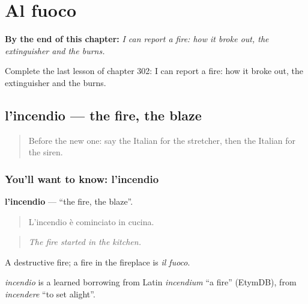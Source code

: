 
\chapter{Al fuoco}
\label{ch:it-al-fuoco}

\begin{chapteropening}
\textbf{By the end of this chapter:} \emph{I can report a fire: how it broke out, the extinguisher and the burns.}

Complete the last lesson of chapter 302: I can report a fire: how it broke out, the extinguisher and the burns.
\end{chapteropening}

\section[l'incendio]{l'incendio — the fire, the blaze}

\label{lesson:IT-C302-incendio}



\begin{quote}
Before the new one: say the Italian for the stretcher, then the Italian for the siren.
\end{quote}

\subsection*{You'll want to know: l'incendio}
\textbf{l'incendio} — \textquotedblleft{}the fire, the blaze\textquotedblright{}.

\begin{quote}
L'incendio è cominciato in cucina.
\end{quote}

\begin{quote}
\emph{The fire started in the kitchen.}
\end{quote}

A destructive fire; a fire in the fireplace is \emph{il fuoco}.

\begin{cousinweb}
\emph{incendio} is a learned borrowing from Latin \emph{incendium} \textquotedblleft{}a fire\textquotedblright{} (EtymDB), from \emph{incendere} \textquotedblleft{}to set alight\textquotedblright{}.
\end{cousinweb}

